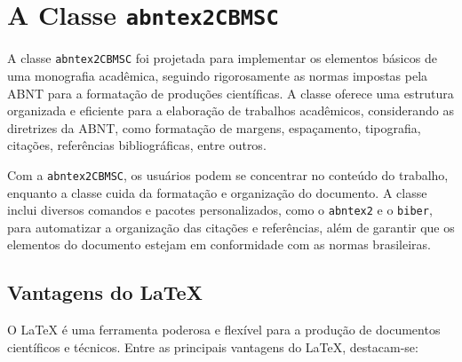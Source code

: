 \chapter{A Classe \texttt{abntex2CBMSC}}

A classe \texttt{abntex2CBMSC} foi projetada para implementar os elementos básicos de uma monografia acadêmica, seguindo rigorosamente as normas impostas pela \acrfull{ABNT} para a formatação de produções científicas. A classe oferece uma estrutura organizada e eficiente para a elaboração de trabalhos acadêmicos, considerando as diretrizes da \acrshort{ABNT}, como formatação de margens, espaçamento, tipografia, citações, referências bibliográficas, entre outros.

Com a \texttt{abntex2CBMSC}, os usuários podem se concentrar no conteúdo do trabalho, enquanto a classe cuida da formatação e organização do documento. A classe inclui diversos comandos e pacotes personalizados, como o \texttt{abntex2} e o \texttt{biber}, para automatizar a organização das citações e referências, além de garantir que os elementos do documento estejam em conformidade com as normas brasileiras.

\section{Vantagens do LaTeX}

O LaTeX é uma ferramenta poderosa e flexível para a produção de documentos científicos e técnicos. Entre as principais vantagens do LaTeX, destacam-se:

